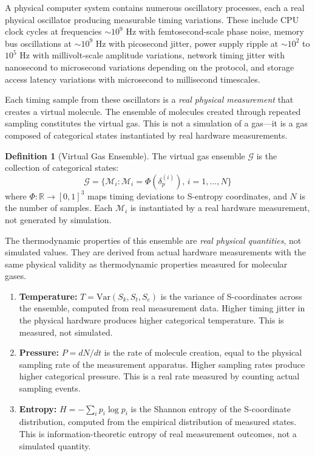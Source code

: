\documentclass[12pt,a4paper]{article}
\theoremstyle{definition}
\newtheorem{definition}[theorem]{Definition}
\theoremstyle{remark}
\begin{document}
A physical computer system contains numerous oscillatory processes, each a real physical oscillator producing measurable timing variations. These include CPU clock cycles at frequencies $\sim 10^9$ Hz with femtosecond-scale phase noise, memory bus oscillations at $\sim 10^9$ Hz with picosecond jitter, power supply ripple at $\sim 10^2$ to $10^5$ Hz with millivolt-scale amplitude variations, network timing jitter with nanosecond to microsecond variations depending on the protocol, and storage access latency variations with microsecond to millisecond timescales.

Each timing sample from these oscillators is a \textit{real physical measurement} that creates a virtual molecule. The ensemble of molecules created through repeated sampling constitutes the virtual gas. This is not a simulation of a gas—it is a gas composed of categorical states instantiated by real hardware measurements.

\begin{definition}[Virtual Gas Ensemble]
\label{def:virtual_gas_ensemble}
The virtual gas ensemble $\mathcal{G}$ is the collection of categorical states:
\begin{equation}
\mathcal{G} = \{\mathcal{M}_i : \mathcal{M}_i = \Phi(\delta_p^{(i)}), \, i = 1, \ldots, N\}
\end{equation}
where $\Phi: \mathbb{R} \to [0,1]^3$ maps timing deviations to S-entropy coordinates, and $N$ is the number of samples. Each $\mathcal{M}_i$ is instantiated by a real hardware measurement, not generated by simulation.
\end{definition}

The thermodynamic properties of this ensemble are \textit{real physical quantities}, not simulated values. They are derived from actual hardware measurements with the same physical validity as thermodynamic properties measured for molecular gases.

\begin{enumerate}
    \item \textbf{Temperature:} $T = \text{Var}(S_k, S_t, S_e)$ is the variance of S-coordinates across the ensemble, computed from real measurement data. Higher timing jitter in the physical hardware produces higher categorical temperature. This is measured, not simulated.

    \item \textbf{Pressure:} $P = dN/dt$ is the rate of molecule creation, equal to the physical sampling rate of the measurement apparatus. Higher sampling rates produce higher categorical pressure. This is a real rate measured by counting actual sampling events.

    \item \textbf{Entropy:} $H = -\sum_i p_i \log p_i$ is the Shannon entropy of the S-coordinate distribution, computed from the empirical distribution of measured states. This is information-theoretic entropy of real measurement outcomes, not a simulated quantity.
\end{enumerate}
\end{document}
